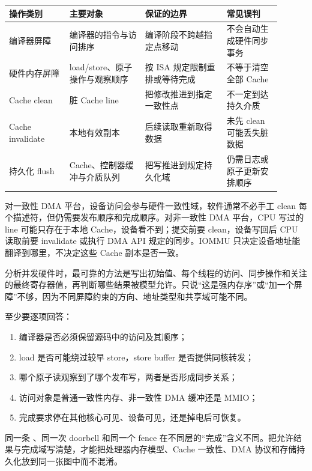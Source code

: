 \begin{longtable}{L{0.20\linewidth}L{0.25\linewidth}L{0.27\linewidth}L{0.18\linewidth}}
\toprule
操作类别 & 主要对象 & 保证的边界 & 常见误判 \\
\midrule
编译器屏障 & 编译器的指令与访问排序 & 编译阶段不跨越指定点移动 & 不会自动生成硬件同步事务 \\
硬件内存屏障 & load/store、原子操作与观察顺序 & 按 ISA 规定限制重排或等待完成 & 不等于清空全部 Cache \\
Cache clean & 脏 Cache line & 把修改推进到指定一致性点 & 不一定到达持久介质 \\
Cache invalidate & 本地有效副本 & 后续读取重新取得数据 & 未先 clean 可能丢失脏数据 \\
持久化 flush & Cache、控制器缓冲与介质队列 & 把写推进到规定持久化域 & 仍需日志或原子更新安排顺序 \\
\bottomrule
\end{longtable}

对一致性 DMA 平台，设备访问会参与硬件一致性域，软件通常不必手工 clean 每个描述符，但仍需要发布顺序和完成顺序。对非一致性 DMA 平台，CPU 写过的 line 可能只存在于本地 Cache，设备看不到；提交前要 clean，设备写回后 CPU 读取前要 invalidate 或执行 DMA API 规定的同步。IOMMU 只决定设备地址能翻译到哪里，不决定这些 Cache 副本是否一致。


分析并发硬件时，最可靠的方法是写出初始值、每个线程的访问、同步操作和关注的最终寄存器值，再判断哪些结果被模型允许。只说“这是强内存序”或“加一个屏障”不够，因为不同屏障约束的方向、地址类型和共享域可能不同。

至少要逐项回答：

\begin{enumerate}
  \item 编译器是否必须保留源码中的访问及其顺序；
  \item load 是否可能绕过较早 store，store buffer 是否提供同核转发；
  \item 哪个原子读观察到了哪个发布写，两者是否形成同步关系；
  \item 访问对象是普通一致性内存、非一致性 DMA 缓冲还是 MMIO；
  \item 完成要求停在其他核心可见、设备可见，还是掉电后可恢复。
\end{enumerate}

同一条 、同一次 doorbell 和同一个 fence 在不同层的“完成”含义不同。把允许结果与完成域写清楚，才能把处理器内存模型、Cache 一致性、DMA 协议和存储持久化放到同一张图中而不混淆。

